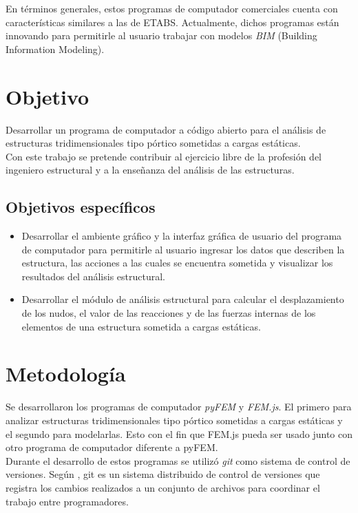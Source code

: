 En términos generales, estos programas de computador comerciales cuenta con características similares a las de ETABS. Actualmente, dichos programas están innovando para permitirle al usuario trabajar con modelos \emph{BIM} (Building Information Modeling).\\

\section{Objetivo}

Desarrollar un programa de computador a código abierto para el análisis de estructuras tridimensionales tipo pórtico sometidas a cargas estáticas.\\

Con este trabajo se pretende contribuir al ejercicio libre de la profesión del ingeniero estructural y a la enseñanza del análisis de las estructuras.

\subsection{Objetivos específicos}

\begin{itemize}
\item Desarrollar el ambiente gráfico y la interfaz gráfica de usuario del programa de computador para permitirle al usuario ingresar los datos que describen la estructura, las acciones a las cuales se encuentra sometida y visualizar los resultados del análisis estructural.
\item Desarrollar el módulo de análisis estructural para calcular el desplazamiento de los nudos, el valor de las reacciones y de las fuerzas internas de los elementos de una estructura sometida a cargas estáticas.
\end{itemize}

\section{Metodología}

Se desarrollaron los programas de computador \emph{pyFEM} y \emph{FEM.js}. El primero para analizar estructuras tridimensionales tipo pórtico sometidas a cargas estáticas y el segundo para modelarlas. Esto con el fin que FEM.js pueda ser usado junto con otro programa de computador diferente a pyFEM.\\

Durante el desarrollo de estos programas se utilizó \emph{git} como sistema de control de versiones. Según \cite{chacon2014git}, git es un sistema distribuido de control de versiones que registra los cambios realizados a un conjunto de archivos para coordinar el trabajo entre programadores.\\

